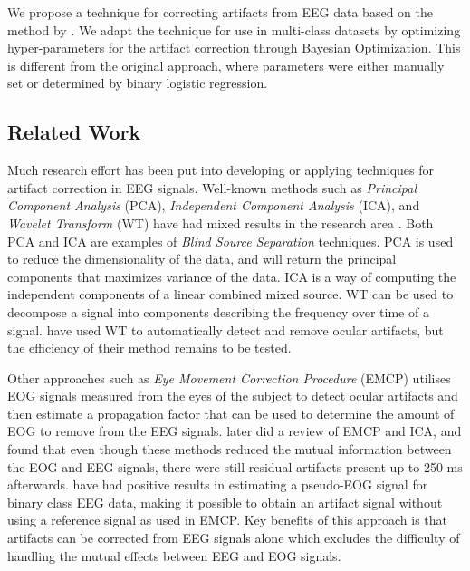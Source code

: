 We propose a technique for correcting artifacts from EEG data based on the method by \citep{li2015ocular}. We adapt the technique for use in multi-class datasets by optimizing hyper-parameters for the artifact correction through Bayesian Optimization. This is different from the original approach, where parameters were either manually set or determined by binary logistic regression.

\subsection{Related Work}
Much research effort has been put into developing or applying techniques for artifact correction in EEG signals. Well-known methods such as \emph{Principal Component Analysis} (PCA), \emph{Independent Component Analysis} (ICA), and \emph{Wavelet Transform} (WT) have had mixed results in the research area \citep{uriguen2015eeg}. Both PCA and ICA are examples of \emph{Blind Source Separation} techniques. PCA is used to reduce the dimensionality of the data, and will return the principal components that maximizes variance of the data. ICA is a way of computing the independent components of a linear combined mixed source. WT can be used to decompose a signal into components describing the frequency over time of a signal. \cite{krishnaveni2006automatic} have used WT to automatically detect and remove ocular artifacts, but the efficiency of their method remains to be tested. 

Other approaches such as \emph{Eye Movement Correction Procedure} (EMCP) \citep{gratton1983new} utilises EOG signals measured from the eyes of the subject to detect ocular artifacts and then estimate a propagation factor that can be used to determine the amount of EOG to remove from the EEG signals. \cite{hoffmann2008correction} later did a review of EMCP and ICA, and found that even though these methods reduced the mutual information between the EOG and EEG signals, there were still residual artifacts present up to 250 ms afterwards. \cite{li2015ocular} have had positive results in estimating a pseudo-EOG signal for binary class EEG data, making it possible to obtain an artifact signal without using a reference signal as used in EMCP. Key benefits of this approach is that artifacts can be corrected from EEG signals alone which excludes the difficulty of handling the mutual effects between EEG and EOG signals.

